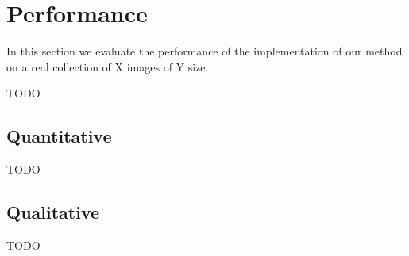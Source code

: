 \section{Performance}\label{sec:performance}

In this section we evaluate the performance of
the implementation of our method
on a real collection of X images of Y size.
\begin{edit}
TODO
\end{edit}

\subsection{Quantitative}\label{ssec:quant}
\begin{edit}
TODO
\end{edit}


\subsection{Qualitative}\label{ssec:qual}
\begin{edit}
TODO
\end{edit}